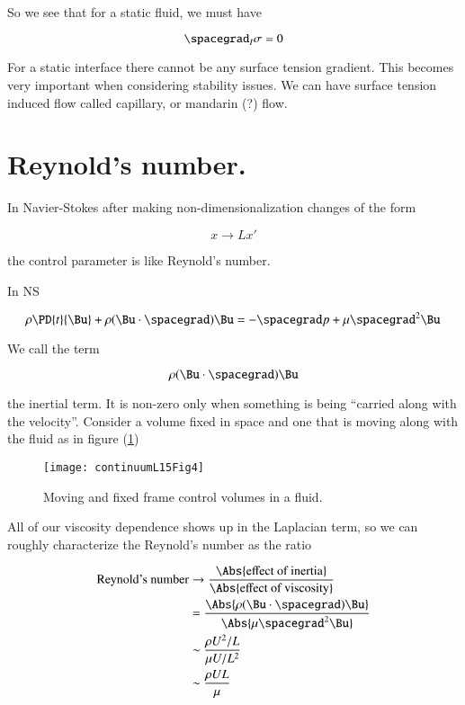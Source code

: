 So we see that for a static fluid, we must have

\begin{equation}\label{eqn:continuumL15:110}
\spacegrad_I \sigma = 0
\end{equation}

For a static interface there cannot be any surface tension gradient.  This becomes very important when considering stability issues.  We can have surface tension induced flow called capillary, or mandarin (?) flow.

\section{Reynold's number.}

In Navier-Stokes after making non-dimensionalization changes of the form

\begin{equation}\label{eqn:continuumL15:150}
x \rightarrow L x'
\end{equation}

the control parameter is like Reynold's number.

In NS

\begin{equation}\label{eqn:continuumL15:170}
\rho \PD{t}{\Bu} + \rho ( \Bu \cdot \spacegrad ) \Bu = - \spacegrad p + \mu \spacegrad^2 \Bu
\end{equation}

We call the term

\begin{equation}\label{eqn:continuumL15:190}
\rho ( \Bu \cdot \spacegrad ) \Bu
\end{equation}

the inertial term.  It is non-zero only when something is being ``carried along with the velocity''.  Consider a volume fixed in space and one that is moving along with the fluid as in figure (\ref{fig:continuumL15:continuumL15Fig4})
\begin{figure}[htp]
   \centering
   \texttt{[image: continuumL15Fig4]}
   \caption{Moving and fixed frame control volumes in a fluid.}\label{fig:continuumL15:continuumL15Fig4}
\end{figure}

All of our viscosity dependence shows up in the Laplacian term, so we can roughly characterize the Reynold's number as the ratio

\begin{align*}
\text{Reynold's number}
&\rightarrow
\frac{\Abs{\text{effect of inertia}}}{\Abs{\text{effect of viscosity}}}  \\
&=
\frac{ \Abs{\rho ( \Bu \cdot \spacegrad ) \Bu } }{\Abs{ \mu \spacegrad^2 \Bu}} \\
&\sim
\frac{ \rho U^2/L }{\mu U/L^2} \\
&\sim
\frac{ \rho U L }{\mu }
\end{align*}

